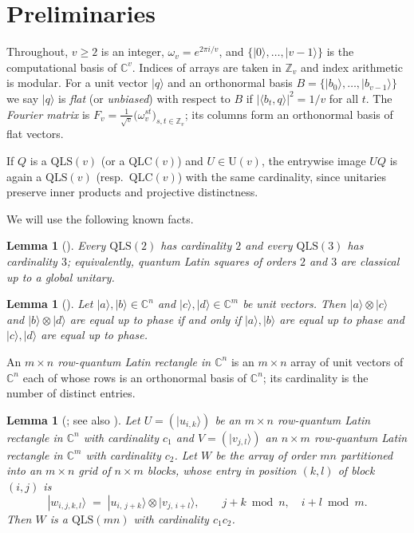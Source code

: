 \documentclass[11pt]{amsart}
\newtheorem{lemma}[theorem]{Lemma}
\theoremstyle{definition}
\newcommand{\C}{\mathbb{C}}
\newcommand{\Z}{\mathbb{Z}}
\newcommand{\ket}[1]{|#1\rangle}
\newcommand{\ip}[2]{\langle #1,#2\rangle}
\newcommand{\QLS}{\mathrm{QLS}}
\newcommand{\QLC}{\mathrm{QLC}}
\begin{document}
\section{Preliminaries}\label{sec:prelim}

Throughout, $v\ge2$ is an integer, $\omega_v=e^{2\pi i/v}$, and
$\{\ket0,\dots,\ket{v-1}\}$ is the computational basis of $\C^v$.  Indices
of arrays are taken in $\Z_v$ and index arithmetic is modular.  For a unit
vector $\ket q$ and an orthonormal basis $B=\{\ket{b_0},\dots,\ket{b_{v-1}}\}$
we say $\ket q$ is \emph{flat} (or \emph{unbiased}) with respect to $B$ if
$|\ip{b_t}{q}|^2=1/v$ for all $t$.  The \emph{Fourier matrix} is
$F_v=\frac1{\sqrt v}\bigl(\omega_v^{st}\bigr)_{s,t\in\Z_v}$; its columns
form an orthonormal basis of flat vectors.

If $Q$ is a $\QLS(v)$ (or a $\QLC(v)$) and $U\in\mathrm U(v)$, the entrywise
image $UQ$ is again a $\QLS(v)$ (resp.\ $\QLC(v)$) with the same
cardinality, since unitaries preserve inner products and projective
distinctness.

We will use the following known facts.

\begin{lemma}[{\cite{Paczos2021}}]\label{lem:small-qls}
Every $\QLS(2)$ has cardinality $2$ and every $\QLS(3)$ has cardinality
$3$; equivalently, quantum Latin squares of orders $2$ and $3$ are
classical up to a global unitary.
\end{lemma}

\begin{lemma}[{\cite[Lem.~2.6]{ZhangCao2026}}]\label{lem:tensor}
Let $\ket a,\ket b\in\C^n$ and $\ket c,\ket d\in\C^m$ be unit vectors.  Then
$\ket a\otimes\ket c$ and $\ket b\otimes\ket d$ are equal up to phase if and
only if $\ket a,\ket b$ are equal up to phase and $\ket c,\ket d$ are equal
up to phase.
\end{lemma}

An \emph{$m\times n$ row-quantum Latin rectangle in $\C^n$} is an $m\times
n$ array of unit vectors of $\C^n$ each of whose rows is an orthonormal
basis of $\C^n$; its cardinality is the number of distinct entries.

\begin{lemma}[{\cite[Thm.~3.1]{ZhangCao2026}}; see also
{\cite[Lem.~2.2]{ZZLC2026}}]\label{lem:product}
Let $U=(\ket{u_{i,k}})$ be an $m\times n$ row-quantum Latin rectangle in
$\C^n$ with cardinality $c_1$ and $V=(\ket{v_{j,l}})$ an $n\times m$
row-quantum Latin rectangle in $\C^m$ with cardinality $c_2$.  Let $W$ be
the array of order $mn$ partitioned into an $m\times n$ grid of $n\times m$
blocks, whose entry in position $(k,l)$ of block $(i,j)$ is
\[
\ket{w_{i,j,k,l}}\;=\;\ket{u_{i,\,j+k}}\otimes\ket{v_{j,\,i+l}},
\qquad j+k \bmod n,\quad i+l \bmod m .
\]
Then $W$ is a $\QLS(mn)$ with cardinality $c_1c_2$.
\end{lemma}
\end{document}
